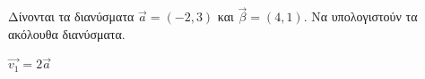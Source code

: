 Δίνονται τα διανύσματα $ \vec{a}=(-2,3) $ και $ \vec{\beta}=(4,1) $. Να υπολογιστούν τα ακόλουθα διανύσματα.
\begin{rlist}
\item $ \vec{v_1}=2\vec{a} $
\end{rlist}